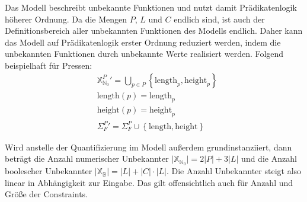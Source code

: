 Das Modell beschreibt unbekannte Funktionen und nutzt damit Prädikatenlogik höherer Ordnung.
Da die Mengen $P$, $L$ und $C$ endlich sind, ist auch der Definitionsbereich aller unbekannten Funktionen des Modells endlich.
Daher kann das Modell auf Prädikatenlogik erster Ordnung reduziert werden, indem die unbekannten Funktionen durch unbekannte Werte realisiert werden.
Folgend beispielhaft für Pressen:
\begin{align*}
    &\hspace{0pt} \mathbb{X}_{\mathbb{N}_0}^{P}\prime = \bigcup_{p \in P} \left\{\text{length}_p, \text{height}_p\right\} \\
    &\hspace{0pt} \text{length}(p) = \text{length}_p \\
    &\hspace{0pt} \text{height}(p) = \text{height}_p \\
    &\hspace{0pt} \Sigma_{F}^{P}\prime = \Sigma_{F}^{P} \cup \left\{ \text{length}, \text{height} \right\}
\end{align*}

Wird anstelle der Quantifizierung im Modell außerdem grundinstanziiert, dann beträgt die Anzahl numerischer Unbekannter
$\lvert \mathbb{X}_{\mathbb{N}_0} \rvert = 2 \lvert P \rvert + 3 \lvert L \rvert$ und die Anzahl boolescher Unbekannter
$\lvert \mathbb{X}_{\mathbb{B}} \rvert = \lvert L \rvert + \lvert C \rvert \cdot \lvert L \rvert$.
Die Anzahl Unbekannter steigt also linear in Abhängigkeit zur Eingabe.
Das gilt offensichtlich auch für Anzahl und Größe der Constraints.

